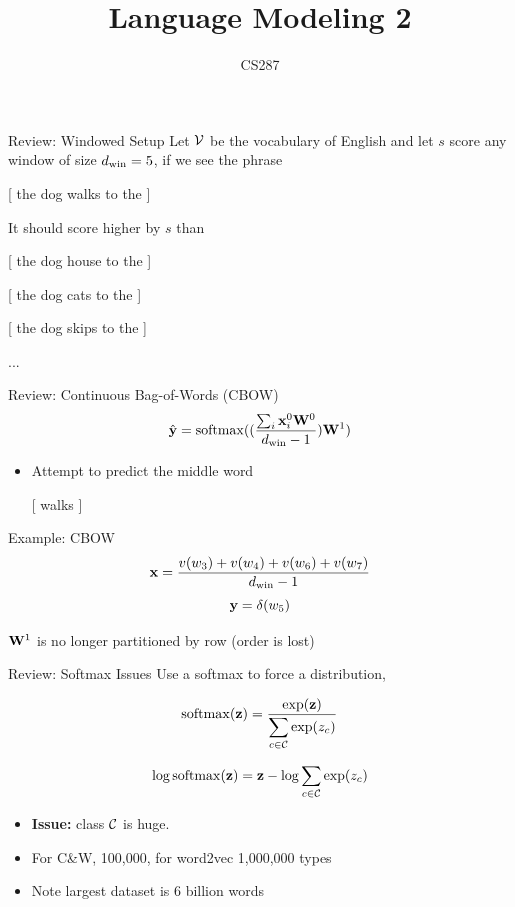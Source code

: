 \documentclass{beamer}
\title{Language Modeling 2}
\date{}
\author{CS287}
\begin{document}
\begin{frame}
  \titlepage
\end{frame}

\begin{frame}{Review: Windowed Setup}
  Let $\mathcal{V}$ be the vocabulary of English and let $s$
  score any window of size ${d_{\mathrm{win}}} =5$, if we see the phrase

  \begin{center}
  [ the dog walks to the ]
  \end{center}



  It should score higher by $s$ than
  \begin {center}
  [ the dog \alert{house} to the ]

   [ the dog \alert{cats} to the ]

   [ the dog \alert{skips} to the ]

   ...
  \end{center}
\end{frame}


\begin{frame}{Review: Continuous Bag-of-Words (CBOW) }
  \[\hat{\boldy} = \softmax((\frac{\sum_{i} \boldx_i^0 \boldW^0}{\dwin-1})\boldW^1)\]
  \begin{itemize}

  \item Attempt to predict the middle word
    \begin{center}
      [  \alert{walks}  ]
    \end{center}
  \end{itemize}

  Example: CBOW
  \[ \mathbf{x} = \frac{v(w_3) +  v(w_4) +   v(w_6) + v(w_7)}{{d_{\mathrm{win}}}-1}  \]
  \[ \mathbf{y} = \delta(w_5) \]


  $\mathbf{W}^1$ is no longer partitioned by row (order is lost)
\end{frame}

\begin{frame}{Review: Softmax Issues}
  Use a softmax to force a distribution,

  \[\softmax(\boldz) = \frac{\exp(\boldz)}{\displaystyle \sum_{c\in \mcC } \exp(z_c)}  \]

  \[\log \softmax(\boldz) = \boldz - \log \sum_{c\in \mcC} \exp(z_c)  \]

  \begin{itemize}
  \item \textbf{Issue:} class $\mathcal{C}$ is huge.
  \item For C\&W, 100,000, for word2vec 1,000,000 types
  \item Note largest dataset is 6 billion words
  \end{itemize}

\end{frame}
\end{document}
